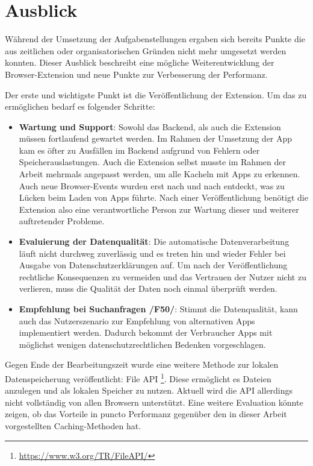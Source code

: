 \section{Ausblick}
\label{s:ausblick}

Während der Umsetzung der Aufgabenstellungen ergaben sich bereits Punkte die aus zeitlichen oder organisatorischen Gründen nicht mehr umgesetzt werden konnten. Dieser Ausblick beschreibt eine mögliche Weiterentwicklung der Browser-Extension und neue Punkte zur Verbesserung der Performanz.

Der erste und wichtigste Punkt ist die Veröffentlichung der Extension. Um das zu ermöglichen bedarf es folgender Schritte:

\begin{itemize}
	\item \textbf{Wartung und Support}:
	Sowohl das Backend, als auch die Extension müssen fortlaufend gewartet werden. Im Rahmen der Umsetzung der App kam es öfter zu Ausfällen im Backend aufgrund von Fehlern oder Speicherauslastungen. Auch die Extension selbst musste im Rahmen der Arbeit mehrmals angepasst werden, um alle Kacheln mit Apps zu erkennen. Auch neue Browser-Events wurden erst nach und nach entdeckt, was zu Lücken beim Laden von Apps führte. Nach einer Veröffentlichung benötigt die Extension also eine verantwortliche Person zur Wartung dieser und weiterer auftretender Probleme.
	\item \textbf{Evaluierung der Datenqualität}:
	Die automatische Datenverarbeitung läuft nicht durchweg zuverlässig und es treten hin und wieder Fehler bei Ausgabe von Datenschutzerklärungen auf. Um nach der Veröffentlichung rechtliche Konsequenzen zu vermeiden und das Vertrauen der Nutzer nicht zu verlieren, muss die Qualität der Daten noch einmal überprüft werden.
	\item \textbf{Empfehlung bei Suchanfragen /F50/}:
	Stimmt die Datenqualität, kann auch das Nutzerszenario zur Empfehlung von alternativen Apps implementiert werden. Dadurch bekommt der Verbraucher Apps mit möglichst wenigen datenschutzrechtlichen Bedenken vorgeschlagen.
\end{itemize}

Gegen Ende der Bearbeitungszeit wurde eine weitere Methode zur lokalen Datenspeicherung veröffentlicht: \glqq File API \grqq{}\footnote{\url{https://www.w3.org/TR/FileAPI/}}.
Diese ermöglicht es Dateien anzulegen und als lokalen Speicher zu nutzen. Aktuell wird die API allerdings nicht vollständig von allen Browsern unterstützt. Eine weitere Evaluation könnte zeigen, ob das Vorteile in puncto Performanz gegenüber den in dieser Arbeit vorgestellten Caching-Methoden hat. 

